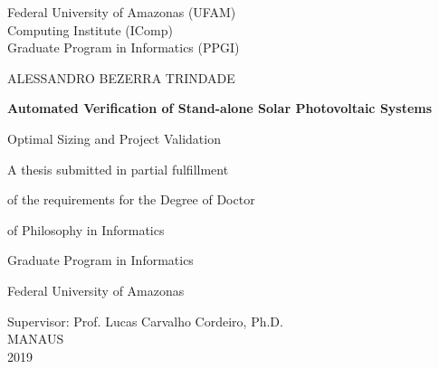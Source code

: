 \begin{titlepage}
    \begin{center}
        \Large
        Federal University of Amazonas (UFAM)\\
        Computing Institute (IComp)\\
		Graduate Program in Informatics (PPGI)\\

        \vspace*{1cm}
        
		\Large
		ALESSANDRO BEZERRA TRINDADE

        \vspace*{2cm}
        		        
        \Huge
        \textbf{Automated Verification of Stand-alone Solar Photovoltaic Systems}
        
        \vspace{0.5cm}
        \LARGE
        Optimal Sizing and Project Validation
        
        \vspace{2cm}
    \end{center}        
    

\hspace{6cm}        A thesis submitted in partial fulfillment

\hspace{6cm}        of the requirements for the Degree of Doctor

\hspace{6cm}        of Philosophy in Informatics

\hspace{6cm}        Graduate Program in Informatics 

\hspace{6cm}        Federal University of Amazonas
        
        \vspace{3cm}
        
        \begin{center}
        Supervisor: Prof. Lucas Carvalho Cordeiro, Ph.D.\\
        \vspace{1cm}
        MANAUS\\
        2019\\
        \end{center}
\end{titlepage}